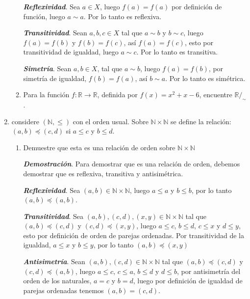 \documentclass{report}
\begin{document}
\begin{enumerate}
\begin{enumerate}
        \textit{\textbf{Reflexividad}}. Sea $a \in X$, luego $f(a) = f(a)$ por definición de función, luego $a\sim a$. Por lo tanto es reflexiva.

        \textit{\textbf{Transitividad}}. Sean $a,b,c \in X$ tal que $a\sim b$ y $b\sim c$, luego $f(a) = f(b)$ y $f(b) = f(c)$, así $f(a) = f(c)$, esto por transitividad de igualdad, luego $a\sim c$. Por lo tanto es transitiva.

        \textit{\textbf{Simetría}}. Sean $a,b \in X$, tal que $a \sim b$, luego $f(a) = f(b)$, por simetría de igualdad, $f(b) = f(a)$, así $b \sim a$. Por lo tanto es simétrica.

        \item Para la función $f: \mathbb{R} \to \mathbb{R}$, definida por $f(x) = x^2 +x -6$, encuentre $\mathbb{R}/_\sim$.
    \end{enumerate}

    \item considere $(\mathbb{N}, \leq)$ con el orden usual. Sobre $\mathbb{N} \times \mathbb{N}$ se define la relación: $(a,b) \preceq (c,d)$ si $a \leq c$ y $b \leq d$.
    
    \begin{enumerate}
        \item Demuestre que esta es una relación de orden sobre $\mathbb{N} \times \mathbb{N}$

        \textit{\textbf{Demostración}}. Para demostrar que es una relación de orden, debemos demostrar que es reflexiva, transitiva y antisimétrica.

        \textit{\textbf{Reflexividad}}. Sea $(a,b) \in \mathbb{N} \times \mathbb{N}$, luego $a \leq a$ y $b \leq b$, por lo tanto $(a,b) \preceq (a,b)$.

        \textit{\textbf{Transitividad}}. Sea $(a, b), (c,d), (x,y) \in \mathbb{N} \times \mathbb{N}$ tal que $(a,b) \preceq (c,d)$ y $(c,d) \preceq (x,y)$, luego $a \leq c$, $b \leq d$, $c\leq x$ y $d \leq y$, esto por definición de orden de parejas ordenadas. Por transitividad de la igualdad, $a \leq x$ y $b\leq y$, por lo tanto $(a,b) \preceq (x,y)$

        \textit{\textbf{Antisimetría}}. Sean $(a,b), (c,d) \in \mathbb{N} \times \mathbb{N}$ tal que $(a,b) \preceq (c,d)$ y $(c,d) \preceq (a,b)$, luego $a \leq c$, $c \leq a$, $b\leq d$ y $d \leq b$, por antisimetría del orden de los naturales, $a = c$ y $b = d$, luego por definición de igualdad de parejas ordenadas tenemos $(a,b) = (c,d)$.


\end{enumerate}
\end{enumerate}
\end{document}
